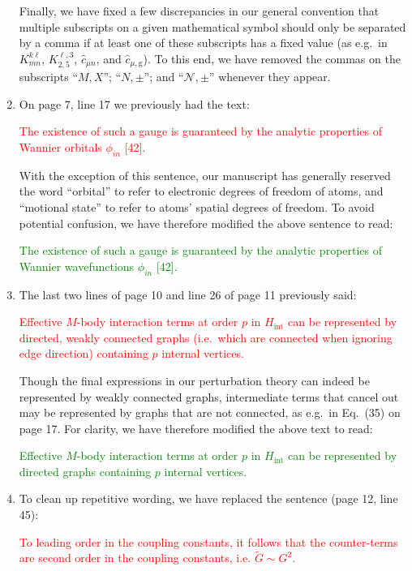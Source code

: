 \documentclass[preprint]{revtex4-1}
\renewcommand{\t}{\text} %
\newcommand{\g}{\text{g}}
\renewcommand{\c}{\hat{c}}
\newcommand{\N}{\mathcal{N}}
\newcommand{\1}{\mathds{1}}
\newcommand{\red}[1]{\textcolor{red}{#1}}
\newcommand{\green}[1]{\textcolor{green}{#1}}
\begin{document}
\begin{enumerate}[label=(R3.\arabic*)]
  Finally, we have fixed a few discrepancies in our general convention
  that multiple subscripts on a given mathematical symbol should only
  be separated by a comma if at least one of these subscripts has a
  fixed value (as e.g.~in $K^{k\ell}_{mn}$, $K^{\ell,3}_{2,5}$,
  $\c_{\mu n}$, and $\c_{\mu,\g}$).  To this end, we have removed the
  commas on the subscripts ``$M,X$''; ``$N,\pm$''; and ``$\N,\pm$''
  whenever they appear.


\item On page 7, line 17 we previously had the text:

  \red{The existence of such a gauge is guaranteed by the analytic
    properties of Wannier orbitals $\phi_{in}$ [42].}

  With the exception of this sentence, our manuscript has generally
  reserved the word ``orbital'' to refer to electronic degrees of
  freedom of atoms, and ``motional state'' to refer to atoms' spatial
  degrees of freedom.  To avoid potential confusion, we have therefore
  modified the above sentence to read:

  \green{The existence of such a gauge is guaranteed by the analytic
    properties of Wannier wavefunctions $\phi_{in}$ [42].}


\item The last two lines of page 10 and line 26 of page 11 previously
  said:

  \red{Effective $M$-body interaction terms at order $p$ in
    $H_{\t{int}}$ can be represented by directed, weakly connected
    graphs (i.e.~which are connected when ignoring edge direction)
    containing $p$ internal vertices.}

  Though the final expressions in our perturbation theory can indeed
  be represented by weakly connected graphs, intermediate terms that
  cancel out may be represented by graphs that are not connected, as
  e.g.~in Eq.~(35) on page 17.  For clarity, we have therefore
  modified the above text to read:

  \green{Effective $M$-body interaction terms at order $p$ in
    $H_{\t{int}}$ can be represented by directed graphs containing $p$
    internal vertices.}


\item To clean up repetitive wording, we have replaced the sentence
  (page 12, line 45):

  \red{To leading order in the coupling constants, it follows that the
    counter-terms are second order in the coupling constants,
    i.e. $\tilde G\sim G^2$.}


\end{enumerate}
\end{document}

